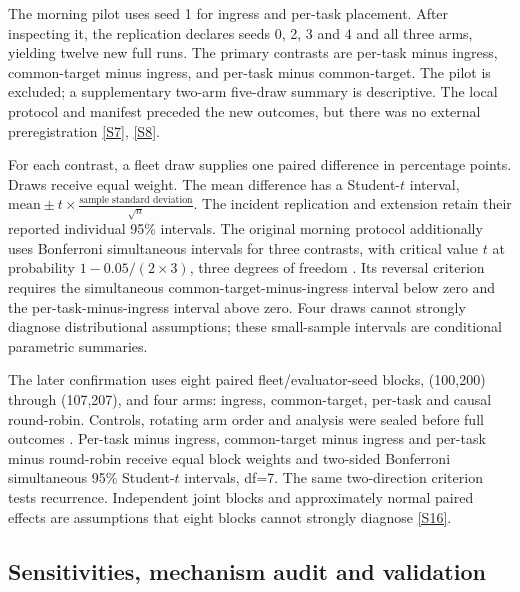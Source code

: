 \documentclass[12pt,a4paper]{article}
\begin{document}
The morning pilot uses seed 1 for ingress and per-task placement. After inspecting it, the replication declares seeds 0, 2, 3 and 4 and all three arms, yielding twelve new full runs. The primary contrasts are per-task minus ingress, common-target minus ingress, and per-task minus common-target. The pilot is excluded; a supplementary two-arm five-draw summary is descriptive. The local protocol and manifest preceded the new outcomes, but there was no external preregistration \cite{ref33} \hyperref[source-s7]{[S7]}, \hyperref[source-s8]{[S8]}.

For each contrast, a fleet draw supplies one paired difference in percentage points. Draws receive equal weight. The mean difference has a Student-$t$ interval, $\text{mean}\pm t\times\frac{\text{sample standard deviation}}{\sqrt{n}}$. The incident replication and extension retain their reported individual 95\% intervals. The original morning protocol additionally uses Bonferroni simultaneous intervals for three contrasts, with critical value $t$ at probability $1-0.05/(2\times 3)$, three degrees of freedom \cite{ref34}. Its reversal criterion requires the simultaneous common-target-minus-ingress interval below zero and the per-task-minus-ingress interval above zero. Four draws cannot strongly diagnose distributional assumptions; these small-sample intervals are conditional parametric summaries.

The later confirmation uses eight paired fleet/evaluator-seed blocks, (100,200) through (107,207), and four arms: ingress, common-target, per-task and causal round-robin. Controls, rotating arm order and analysis were sealed before full outcomes \cite{ref33}. Per-task minus ingress, common-target minus ingress and per-task minus round-robin receive equal block weights and two-sided Bonferroni simultaneous 95\% Student-$t$ intervals, df=7. The same two-direction criterion tests recurrence. Independent joint blocks and approximately normal paired effects are assumptions that eight blocks cannot strongly diagnose \hyperref[source-s16]{[S16]}.

\FloatBarrier
\subsection{Sensitivities, mechanism audit and validation}\label{sec:2.7}
\end{document}
